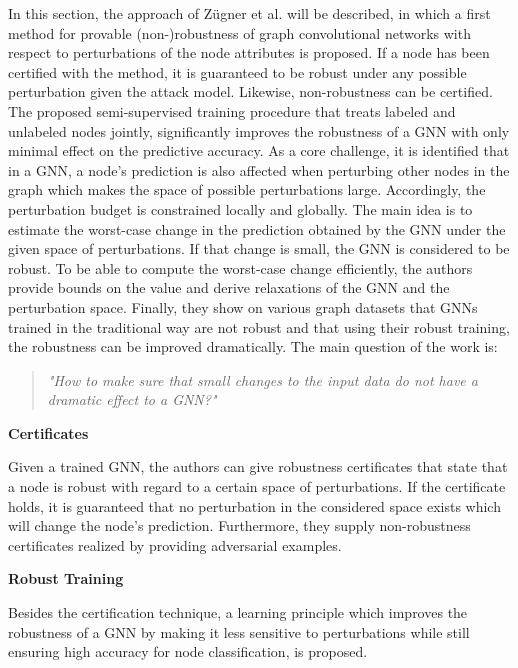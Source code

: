 \documentclass[a4paper,preprint]{sig-alternate}
\begin{document}
In this section, the approach of Zügner et al. \cite{Zuegner_2019} will be described,
in which a first method for provable (non-)robustness of graph convolutional networks with respect
to perturbations of the node attributes is proposed. If a node has been certified with the method, it is guaranteed to be robust under any possible 
perturbation given the attack model. Likewise, non-robustness can be certified. The proposed semi-supervised training procedure that treats 
labeled and unlabeled nodes jointly, significantly improves the robustness of a GNN with only minimal effect on the predictive accuracy.
As a core challenge, it is identified that in a GNN, a node's prediction is also affected when perturbing other nodes in the graph
which makes the space of possible perturbations large. Accordingly, the perturbation budget is constrained locally and globally.
The main idea is to estimate the worst-case change in the prediction obtained by the GNN under the given space of perturbations.
If that change is small, the GNN is considered to be robust. To be able to compute the worst-case change efficiently,
the authors provide bounds on the value and derive relaxations of the GNN and the perturbation space. 
Finally, they show on various graph datasets that GNNs trained in the traditional way are not robust
and that using their robust training, the robustness can be improved dramatically. The main question of the work is:
\begin{quote}
    \emph{"How to make sure that small changes to the input data do not have a dramatic effect to a GNN?"}
\end{quote}

\textbf{Certificates}\newline

Given a trained GNN, the authors can give robustness certificates that state that a
node is robust with regard to a certain space of perturbations. If the certificate
holds, it is guaranteed that no perturbation in the considered space exists
which will change the node's prediction. Furthermore, they supply non-robustness
certificates realized by providing adversarial examples.\newline

\textbf{Robust Training}\newline

Besides the certification technique, a learning principle which improves the robustness of a GNN
by making it less sensitive to perturbations while still ensuring high accuracy for node classification, is proposed.\newline
\end{document}
